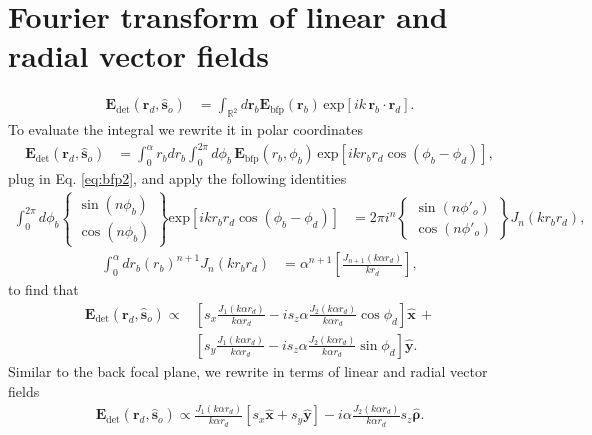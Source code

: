 \documentclass{osa-article}
\providecommand{\mb}[1]{\mathbf{#1}}
\providecommand{\so}{\mathbf{\hat{s}}_o}
\providecommand{\rb}{\mathbf{r}_b}
\providecommand{\rd}{\mathbf{r}_d}
\providecommand{\mh}[1]{\mathbf{\hat{#1}}}
\providecommand{\mbb}[1]{\mathbb{#1}}
\providecommand{\bs}[1]{\boldsymbol{#1}}
\begin{document}
\section{Fourier transform of linear and radial vector fields}\label{sec:ftvec}
  \begin{align}
  \mb{E}_{\text{det}}(\rd{}, \so{}) &= \int_{\mbb{R}^2}d\rb{} \mb{E}_{\text{bfp}}(\rb{})\, \text{exp}\left[ik\,\rb{}\cdot\rd{}\right].\label{eq:det1}
\end{align}
To evaluate the integral we rewrite it in polar coordinates
\begin{align}
\mb{E}_{\text{det}}(\rd{}, \so{}) &= \int_{0}^{\alpha}r_bdr_b\int_0^{2\pi} d\phi_b\, \mb{E}_{\text{bfp}}(r_b, \phi_b)\, \text{exp}\left[ikr_b r_d\cos(\phi_b - \phi_d)\right],
\end{align}
plug in Eq. \ref{eq:bfp2}, and apply the following identities
\begin{align}
  \int_0^{2\pi}d\phi_b
  \left\{\substack{
    \sin(n\phi_b)\\
    \cos(n\phi_b)
  }\right\}
  \text{exp}\left[ikr_br_d\cos(\phi_b - \phi_d)\right] &= 2\pi i^n
  \left\{\substack{
    \sin(n\phi'_o)\\
    \cos(n\phi'_o)
  }\right\}J_n(k r_br_d),
  \end{align}
  \begin{align}
  \int_0^{\alpha} dr_b (r_b)^{n+1}J_{n}(kr_br_d) &= \alpha^{n+1}\left[\frac{J_{n+1}(k\alpha r_d)}{k r_d}\right],
  \end{align}
to find that 
\begin{align}
  \mb{E}_{\text{det}}(\rd{}, \so{}) \propto &\left[s_x\frac{J_1(k\alpha r_d)}{k\alpha r_d} - is_z\alpha \frac{J_2(k\alpha r_d)}{k\alpha r_d}\cos\phi_d\right]\mh{x}\, + \nonumber \\& \left[s_y\frac{J_1(k\alpha r_d)}{k\alpha r_d} - i s_z\alpha \frac{J_2(k\alpha r_d)}{k\alpha r_d}\sin\phi_d\right]\mh{y}.
\end{align}
Similar to the back focal plane, we rewrite in terms of linear and radial vector
fields
\begin{align}
  \mb{E}_{\text{det}}(\rd{}, \so{}) \propto \frac{J_1(k\alpha r_d)}{k\alpha r_d}[s_x\mh{x} + s_y\mh{y}] - i\alpha\frac{J_2(k\alpha r_d)}{k\alpha r_d}s_z\mh{\bs{\rho}}.
\end{align}
\end{document}

